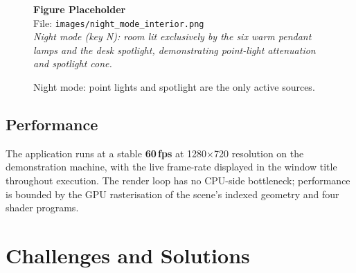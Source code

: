 \documentclass[12pt, a4paper]{article}
\newcommand{\imgph}[2]{%
    \begin{mdframed}[backgroundcolor=lightblue!60, linecolor=sectionblue,
                     linewidth=1pt, roundcorner=4pt, innertopmargin=8pt,
                     innerbottommargin=8pt]
        \centering
        {\bfseries\color{sectionblue} Figure Placeholder}\\[4pt]
        File: \texttt{#1}\\[3pt]
        {\small\itshape #2}
    \end{mdframed}%
}
\begin{document}
\begin{figure}[H]
    \centering
    \imgph{images/night_mode_interior.png}{%
        Night mode (key N): room lit exclusively by the six warm pendant lamps and the
        desk spotlight, demonstrating point-light attenuation and spotlight cone.}
    \caption{Night mode: point lights and spotlight are the only active sources.}
    \label{fig:nightresult}
\end{figure}

\subsection{Performance}

The application runs at a stable \textbf{60\,fps} at 1280$\times$720 resolution on the demonstration machine, with the live frame-rate displayed in the window title throughout execution. The render loop has no CPU-side bottleneck; performance is bounded by the GPU rasterisation of the scene's indexed geometry and four shader programs.

\section{Challenges and Solutions}
\end{document}
